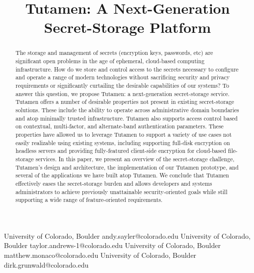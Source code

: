 \documentclass[10pt]{socc}
\begin{document}
\setlength{\pdfpageheight}{\paperheight}
\setlength{\pdfpagewidth}{\paperwidth}


\title{Tutamen: A Next-Generation Secret-Storage Platform}

           {University of Colorado, Boulder}
           {andy.sayler@colorado.edu}
           {University of Colorado, Boulder}
           {taylor.andrews-1@colorado.edu}
           {University of Colorado, Boulder}
           {matthew.monaco@colorado.edu}
           {University of Colorado, Boulder}
           {dirk.grunwald@colorado.edu}

\maketitle

\begin{abstract}
The storage and management of secrets (encryption keys, passwords,
etc) are significant open problems in the age of ephemeral,
cloud-based computing infrastructure. How do we store and control
access to the secrets necessary to configure and operate a range of
modern technologies without sacrificing security and privacy
requirements or significantly curtailing the desirable capabilities of
our systems? To answer this question, we propose Tutamen: a
next-generation secret-storage service. Tutamen offers a number of
desirable properties not present in existing secret-storage
solutions. These include the ability to operate across administrative
domain boundaries and atop minimally trusted infrastructure. Tutamen
also supports access control based on contextual, multi-factor, and
alternate-band authentication parameters. These properties have
allowed us to leverage Tutamen to support a variety of use cases not
easily realizable using existing systems, including supporting
full-disk encryption on headless servers and providing fully-featured
client-side encryption for cloud-based file-storage services. In this
paper, we present an overview of the secret-storage challenge,
Tutamen's design and architecture, the implementation of our Tutamen
prototype, and several of the applications we have built atop
Tutamen. We conclude that Tutamen effectively eases the secret-storage
burden and allows developers and systems administrators to achieve
previously unattainable security-oriented goals while still supporting
a wide range of feature-oriented requirements.
\end{abstract}
\end{document}
